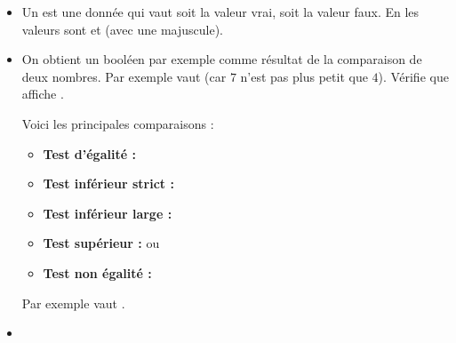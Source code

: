 \documentclass[11pt,class=report,crop=false]{standalone}
\begin{document}

\begin{cours}[Booléens]
\sauteligne
\begin{itemize}
  \item Un  est une donnée qui vaut soit la valeur \og{}vrai\fg{}, soit la valeur \og{}faux\fg{}. En \Python{} les valeurs sont  et  (avec une majuscule).
  
  \item On obtient un booléen par exemple comme résultat de la comparaison de deux nombres.
  Par exemple  vaut  (car $7$ n'est pas plus petit que $4$). 
  Vérifie que  affiche .
  
  Voici les principales comparaisons :
  \begin{itemize}
    \item \textbf{Test d'égalité :}\quad {}\index{\ci{==}}
    	\item \textbf{Test inférieur strict :}\quad {}
    	\item \textbf{Test inférieur large :}\quad {}\index{\ci{<=}}
    	\item \textbf{Test supérieur :}\quad {} \quad ou \quad {}\index{\ci{>=}}
    	\item \textbf{Test non égalité :}\quad {}
  \end{itemize}
   
   Par exemple  vaut .
   

   
   
   \item ~
   

\end{itemize}
\end{cours}
\end{document}
